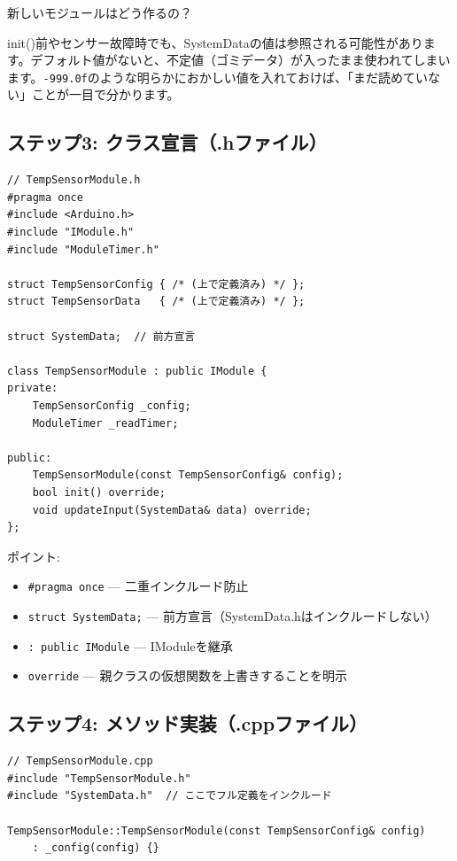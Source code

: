 \begin{qabox}{新しいモジュールはどう作るの？}
\begin{notebox}[なぜデフォルト値を設定するの？]
init()前やセンサー故障時でも、SystemDataの値は参照される可能性があります。デフォルト値がないと、不定値（ゴミデータ）が入ったまま使われてしまいます。\texttt{-999.0f}のような明らかにおかしい値を入れておけば、「まだ読めていない」ことが一目で分かります。
\end{notebox}

\subsection{ステップ3: クラス宣言（.hファイル）}

\begin{lstlisting}
// TempSensorModule.h
#pragma once
#include <Arduino.h>
#include "IModule.h"
#include "ModuleTimer.h"

struct TempSensorConfig { /* (上で定義済み) */ };
struct TempSensorData   { /* (上で定義済み) */ };

struct SystemData;  // 前方宣言

class TempSensorModule : public IModule {
private:
    TempSensorConfig _config;
    ModuleTimer _readTimer;

public:
    TempSensorModule(const TempSensorConfig& config);
    bool init() override;
    void updateInput(SystemData& data) override;
};
\end{lstlisting}

ポイント:
\begin{itemize}
  \item \texttt{\#pragma once} — 二重インクルード防止
  \item \texttt{struct SystemData;} — 前方宣言（SystemData.hはインクルードしない）
  \item \texttt{: public IModule} — IModuleを継承
  \item \texttt{override} — 親クラスの仮想関数を上書きすることを明示
\end{itemize}

\subsection{ステップ4: メソッド実装（.cppファイル）}

\begin{lstlisting}
// TempSensorModule.cpp
#include "TempSensorModule.h"
#include "SystemData.h"  // ここでフル定義をインクルード

TempSensorModule::TempSensorModule(const TempSensorConfig& config)
    : _config(config) {}


\end{lstlisting}
\end{qabox}
